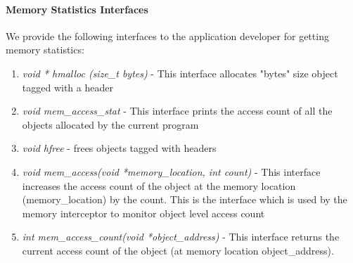 \paragraph{Memory Statistics Interfaces}
We provide the following interfaces to the application developer for getting memory statistics:
\begin{enumerate}
\item {\emph{void * hmalloc (size\_t bytes)}} - This interface allocates "bytes" size object tagged with a header
\item {\emph{void mem\_access\_stat}} - This interface prints the access count of all the objects allocated by the current program
\item {\emph{void hfree}} - frees objects tagged with headers
\item{\emph{void mem\_access(void *memory\_location, int count)}} - This interface increases the access count of the object at the memory location (memory\_location) by the count. This is the interface which is used by the memory interceptor to monitor object level access count
\item {\emph{int mem\_access\_count(void *object\_address)}} - This interface returns the current access count of the object (at memory location object\_address).
\end{enumerate}
